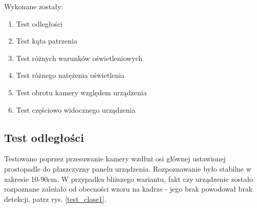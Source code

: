 \documentclass[12pt,twoside,polish]{article}
\begin{document}
Wykonane zostały:
\begin{enumerate}[label=\alph*), leftmargin=1.25cm]
\item Test odległości
\item Test kąta patrzenia
\item Test różnych warunków oświetleniowych
\item Test różnego natężenia oświetlenia
\item Test obrotu kamery względem urządzenia
\item Test częściowo widocznego urządzenia
\end{enumerate}

\subsection{Test odległości}
Testowano poprzez przesuwanie kamery wzdłuż osi głównej ustawionej prostopadle do płaszczyzny panelu urządzenia. Rozpoznawanie było stabilne w zakresie 10-90cm. W przypadku bliższego wariantu, fakt czy urządzenie zostało rozpoznane zależało od obecności wzoru na kadrze - jego brak powodował brak detekcji, patrz rys. \ref{test_close1}.
\end{document}
